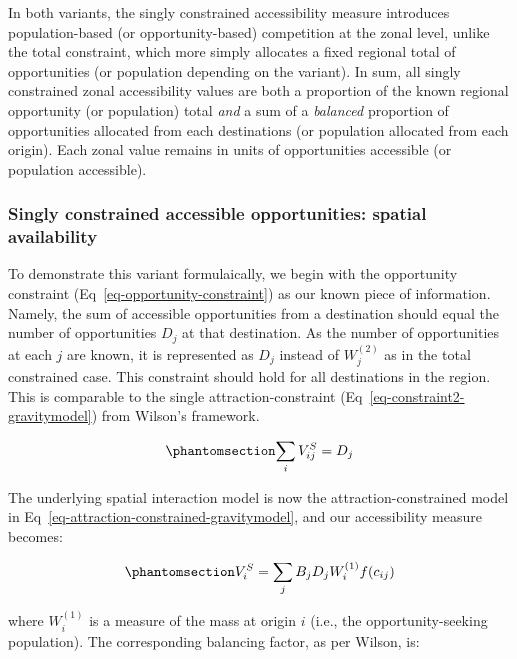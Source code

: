 \documentclass[
  10pt,
  letterpaper,
]{article}
\begin{document}
In both variants, the singly constrained accessibility measure
introduces population-based (or opportunity-based) competition at the
zonal level, unlike the total constraint, which more simply allocates a
fixed regional total of opportunities (or population depending on the
variant). In sum, all singly constrained zonal accessibility values are
both a proportion of the known regional opportunity (or population)
total \emph{and} a sum of a \emph{balanced} proportion of opportunities
allocated from each destinations (or population allocated from each
origin). Each zonal value remains in units of opportunities accessible
(or population accessible).

\subsubsection{Singly constrained accessible opportunities: spatial
availability}\label{singly-constrained-accessible-opportunities-spatial-availability}

To demonstrate this variant formulaically, we begin with the opportunity
constraint (Eq~\ref{eq-opportunity-constraint}) as our known piece of
information. Namely, the sum of accessible opportunities from a
destination should equal the number of opportunities \(D_j\) at that
destination. As the number of opportunities at each \(j\) are known, it
is represented as \(D_j\) instead of \(W_j^(2)\) as in the total
constrained case. This constraint should hold for all destinations in
the region. This is comparable to the single attraction-constraint
(Eq~\ref{eq-constraint2-gravitymodel}) from Wilson's framework.

\begin{equation}\phantomsection\label{eq-opportunity-constraint}{
\sum_i V^S_{ij} =  D_j
}\end{equation}

The underlying spatial interaction model is now the
attraction-constrained model in
Eq~\ref{eq-attraction-constrained-gravitymodel}, and our accessibility
measure becomes:

\begin{equation}\phantomsection\label{eq-opportunity-constrained-accessibility}{
V^S_{i} = \sum_j B_j D_j W_i^{(1)} f(c_{ij})
}\end{equation}

\noindent where \(W_i^{(1)}\) is a measure of the mass at origin \(i\)
(i.e., the opportunity-seeking population). The corresponding balancing
factor, as per Wilson, is:
\end{document}
